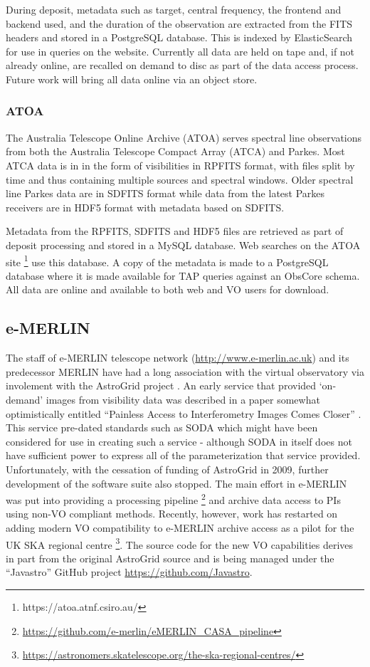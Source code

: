 \documentclass[11pt,a4paper]{ivoatex/ivoa}
\begin{document}
{During deposit, metadata such as target, central frequency, the frontend and backend used, and the duration of the observation are extracted from the FITS headers and stored in a PostgreSQL database.
This is indexed by ElasticSearch for use in queries on the website.
Currently all data are held on tape and, if not already online, are recalled on demand to disc as part of the data access process.
Future work will bring all data online via an object store.

\subsubsection{ATOA}

The Australia Telescope Online Archive (ATOA) serves spectral line observations from both the Australia Telescope Compact Array (ATCA) and Parkes.
Most ATCA data is in in the form of visibilities in RPFITS format, with files split by time and thus containing multiple sources and spectral windows.
Older spectral line Parkes data are in SDFITS format while data from the latest Parkes receivers are in HDF5 format with metadata based on SDFITS.

Metadata from the RPFITS, SDFITS and HDF5 files are retrieved as part of deposit processing and stored in a MySQL database. Web searches on the ATOA site \footnote{https://atoa.atnf.csiro.au/} use this database.
A copy of the metadata is made to a PostgreSQL database where it is made available for TAP queries against an ObsCore schema. 
All data are online and available to both web and VO users for download.

\subsection{e-MERLIN}
\label{sec:emerlin}
The staff of e-MERLIN telescope network (\url{http://www.e-merlin.ac.uk}) and its predecessor MERLIN have had a long association with the virtual
observatory via involement with the AstroGrid project \citep{2002ASPC..281....3M}. An early service that
 provided `on-demand' images from visibility data was described in a paper somewhat optimistically entitled
``Painless Access to Interferometry Images Comes Closer'' \citep{2006ASPC..351..267R}. This service pre-dated standards
such as SODA which might have been considered for use in creating such a service - although SODA in itself does not
have sufficient power to express all of the parameterization that service provided. Unfortunately, with the cessation
of funding of AstroGrid in 2009, further development of the software suite also stopped. The main effort in e-MERLIN was 
put into providing a processing pipeline \footnote{\url{https://github.com/e-merlin/eMERLIN_CASA_pipeline}} and archive data access to
PIs using non-VO compliant methods. Recently, however, work has restarted on adding modern VO compatibility to e-MERLIN
archive access as a pilot for the UK SKA regional centre \footnote{\url{https://astronomers.skatelescope.org/the-ska-regional-centres/}}.
The source code for the new VO capabilities derives in part from the original AstroGrid source and is being managed under the
``Javastro'' GitHub project \url{https://github.com/Javastro}.

}
\end{document}
